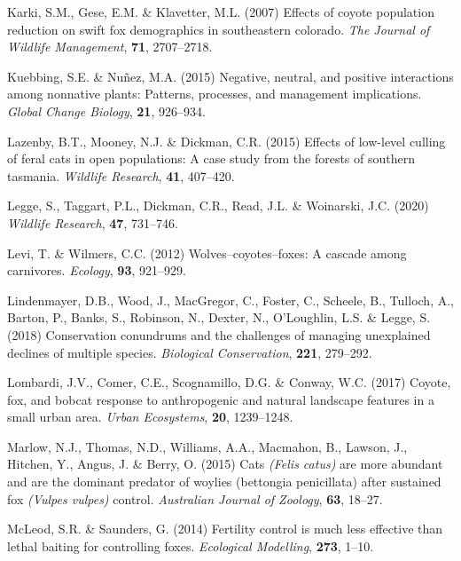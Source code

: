 \documentclass[]{elsarticle} %
\begin{document}
\leavevmode\hypertarget{ref-karki2007effects}{}%
Karki, S.M., Gese, E.M. \& Klavetter, M.L. (2007) Effects of coyote population reduction on swift fox demographics in southeastern colorado. \emph{The Journal of Wildlife Management}, \textbf{71}, 2707--2718.

\leavevmode\hypertarget{ref-kuebbing2015negative}{}%
Kuebbing, S.E. \& Nuñez, M.A. (2015) Negative, neutral, and positive interactions among nonnative plants: Patterns, processes, and management implications. \emph{Global Change Biology}, \textbf{21}, 926--934.

\leavevmode\hypertarget{ref-lazenby2015effects}{}%
Lazenby, B.T., Mooney, N.J. \& Dickman, C.R. (2015) Effects of low-level culling of feral cats in open populations: A case study from the forests of southern tasmania. \emph{Wildlife Research}, \textbf{41}, 407--420.

\leavevmode\hypertarget{ref-legge2020cat}{}%
Legge, S., Taggart, P.L., Dickman, C.R., Read, J.L. \& Woinarski, J.C. (2020) \emph{Wildlife Research}, \textbf{47}, 731--746.

\leavevmode\hypertarget{ref-levi2012wolves}{}%
Levi, T. \& Wilmers, C.C. (2012) Wolves--coyotes--foxes: A cascade among carnivores. \emph{Ecology}, \textbf{93}, 921--929.

\leavevmode\hypertarget{ref-lindenmayer2018conservation}{}%
Lindenmayer, D.B., Wood, J., MacGregor, C., Foster, C., Scheele, B., Tulloch, A., Barton, P., Banks, S., Robinson, N., Dexter, N., O'Loughlin, L.S. \& Legge, S. (2018) Conservation conundrums and the challenges of managing unexplained declines of multiple species. \emph{Biological Conservation}, \textbf{221}, 279--292.

\leavevmode\hypertarget{ref-lombardi2017coyote}{}%
Lombardi, J.V., Comer, C.E., Scognamillo, D.G. \& Conway, W.C. (2017) Coyote, fox, and bobcat response to anthropogenic and natural landscape features in a small urban area. \emph{Urban Ecosystems}, \textbf{20}, 1239--1248.

\leavevmode\hypertarget{ref-marlow2015cats}{}%
Marlow, N.J., Thomas, N.D., Williams, A.A., Macmahon, B., Lawson, J., Hitchen, Y., Angus, J. \& Berry, O. (2015) Cats \emph{(Felis catus)} are more abundant and are the dominant predator of woylies (bettongia penicillata) after sustained fox \emph{(Vulpes vulpes)} control. \emph{Australian Journal of Zoology}, \textbf{63}, 18--27.

\leavevmode\hypertarget{ref-mcleod2014fertility}{}%
McLeod, S.R. \& Saunders, G. (2014) Fertility control is much less effective than lethal baiting for controlling foxes. \emph{Ecological Modelling}, \textbf{273}, 1--10.
\end{document}
